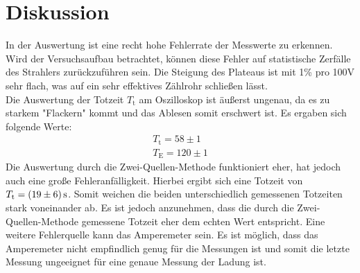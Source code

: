 \section{Diskussion}

In der Auswertung ist eine recht hohe Fehlerrate der Messwerte zu erkennen. Wird der Versuchsaufbau betrachtet, können diese Fehler auf statistische Zerfälle des Strahlers zurückzuführen sein. \*
Die Steigung des Plateaus ist mit 1\% pro 100V sehr flach, was auf ein sehr effektives Zählrohr schließen lässt. \\
Die Auswertung der Totzeit $T_\text{t}$ am Oszilloskop ist äußerst ungenau, da es zu starkem "Flackern" kommt und das Ablesen somit erschwert ist. Es ergaben sich folgende Werte:
\begin{gather*}
	 T_\text{t} =  58\pm1 \\
	T_\text{E} = 120\pm1
\end{gather*}
Die Auswertung durch die Zwei-Quellen-Methode funktioniert eher, hat jedoch auch eine große Fehleranfälligkeit. Hierbei ergibt sich eine Totzeit von $T_\text{t} = \SI{19\pm6}{\second}$. Somit weichen die beiden unterschiedlich gemessenen Totzeiten stark voneinander ab. Es ist jedoch anzunehmen, dass die durch die Zwei-Quellen-Methode gemessene Totzeit eher dem echten Wert entspricht.
Eine weitere Fehlerquelle kann das Amperemeter sein. Es ist möglich, dass das Amperemeter nicht empfindlich genug für die Messungen ist und somit die letzte Messung ungeeignet für eine genaue Messung der Ladung ist.
